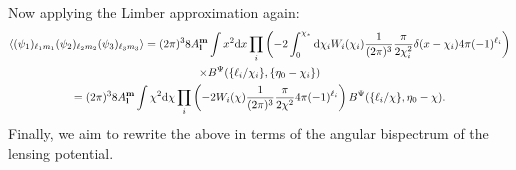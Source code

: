 \documentclass[11pt]{article} %
\DeclareRobustCommand{\d}{\ifmmode\text{d}\else d\fi}
\newcommand{\br}[1]{\ensuremath{\left( #1 \right)}}
\begin{document}
Now applying the Limber approximation again:
\begin{gather*}
    \langle (\psi_1)_{\ell_1m_1}(\psi_2)_{\ell_2m_2}(\psi_3)_{\ell_3m_3} \rangle 
    = (2\pi)^3 8 A_{\mathbf l}^{\mathbf m}\int x^2\d x\prod_i\br{-2\int_0^{\chi_*}\d\chi_i W_i(\chi_i)\frac{1}{(2\pi)^{3}}\frac{\pi}{2\chi_i^2}\delta(x-\chi_i)4\pi (-1)^{\ell_i}} \\ \times B^\Psi(\{\ell_i/\chi_i\}, \{\eta_0-\chi_i\}) \\
    = (2\pi)^3 8 A_{\mathbf l}^{\mathbf m}\int \chi^2\d \chi\prod_i\br{-2 W_i(\chi)\frac{1}{(2\pi)^{3}}\frac{\pi}{2\chi^2}4\pi (-1)^{\ell_i}} B^\Psi(\{\ell_i/\chi\}, \eta_0-\chi).
\end{gather*}
Finally, we aim to rewrite the above in terms of the angular bispectrum of the lensing potential. 
\end{document}
